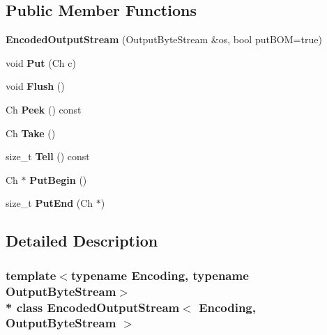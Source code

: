 \subsection*{Public Member Functions}
\begin{DoxyCompactItemize}
\item 
{\bfseries Encoded\+Output\+Stream} (Output\+Byte\+Stream \&os, bool put\+B\+OM=true)\hypertarget{a00094_ad3360c613a30a6a15526ae9ad63bd004}{}\label{a00094_ad3360c613a30a6a15526ae9ad63bd004}

\item 
void {\bfseries Put} (Ch c)\hypertarget{a00094_a0f3c00f94c195a38d78c05ecda497481}{}\label{a00094_a0f3c00f94c195a38d78c05ecda497481}

\item 
void {\bfseries Flush} ()\hypertarget{a00094_a657188f6a9f0fae01a4012c288d3fd46}{}\label{a00094_a657188f6a9f0fae01a4012c288d3fd46}

\item 
Ch {\bfseries Peek} () const \hypertarget{a00094_aa1dbe6b921fe788f3229024fb5598647}{}\label{a00094_aa1dbe6b921fe788f3229024fb5598647}

\item 
Ch {\bfseries Take} ()\hypertarget{a00094_a90f5a5e1598316a417ef5b6ad3d49f36}{}\label{a00094_a90f5a5e1598316a417ef5b6ad3d49f36}

\item 
size\+\_\+t {\bfseries Tell} () const \hypertarget{a00094_ab580ac97f1a22c2a6abc4a31bb5c8272}{}\label{a00094_ab580ac97f1a22c2a6abc4a31bb5c8272}

\item 
Ch $\ast$ {\bfseries Put\+Begin} ()\hypertarget{a00094_a78934de4f76c9fa65238e65d3630cbc5}{}\label{a00094_a78934de4f76c9fa65238e65d3630cbc5}

\item 
size\+\_\+t {\bfseries Put\+End} (Ch $\ast$)\hypertarget{a00094_a818695f6d3fa8896e9d7d0fbdc7d4514}{}\label{a00094_a818695f6d3fa8896e9d7d0fbdc7d4514}

\end{DoxyCompactItemize}


\subsection{Detailed Description}
\subsubsection*{template$<$typename Encoding, typename Output\+Byte\+Stream$>$\\*
class Encoded\+Output\+Stream$<$ Encoding, Output\+Byte\+Stream $>$}

